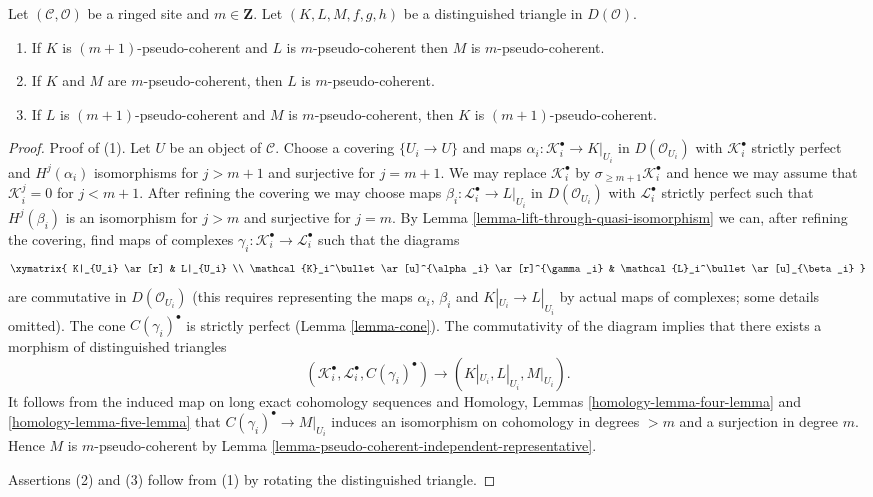 \begin{lemma}
\label{lemma-cone-pseudo-coherent}
Let $(\mathcal{C}, \mathcal{O})$ be a ringed site and $m \in \mathbf{Z}$.
Let $(K, L, M, f, g, h)$ be a distinguished triangle in $D(\mathcal{O})$.
\begin{enumerate}
\item If $K$ is $(m + 1)$-pseudo-coherent and $L$ is $m$-pseudo-coherent
then $M$ is $m$-pseudo-coherent.
\item If $K$ and $M$ are $m$-pseudo-coherent, then $L$ is $m$-pseudo-coherent.
\item If $L$ is $(m + 1)$-pseudo-coherent and $M$
is $m$-pseudo-coherent, then $K$ is $(m + 1)$-pseudo-coherent.
\end{enumerate}
\end{lemma}

\begin{proof}
Proof of (1). Let $U$ be an object of $\mathcal{C}$. Choose a covering
$\{U_i \to U\}$ and maps $\alpha_i : \mathcal{K}_i^\bullet \to K|_{U_i}$
in $D(\mathcal{O}_{U_i})$ with $\mathcal{K}_i^\bullet$ strictly perfect and
$H^j(\alpha_i)$ isomorphisms for $j > m + 1$ and surjective for $j = m + 1$.
We may replace $\mathcal{K}_i^\bullet$ by
$\sigma_{\geq m + 1}\mathcal{K}_i^\bullet$
and hence we may assume that $\mathcal{K}_i^j = 0$
for $j < m + 1$. After refining the covering we may choose
maps $\beta_i : \mathcal{L}_i^\bullet \to L|_{U_i}$ in $D(\mathcal{O}_{U_i})$
with $\mathcal{L}_i^\bullet$ strictly perfect such that
$H^j(\beta_i)$ is an isomorphism for $j > m$ and
surjective for $j = m$. By
Lemma \ref{lemma-lift-through-quasi-isomorphism}
we can, after refining the covering, find maps of complexes
$\gamma_i : \mathcal{K}_i^\bullet \to \mathcal{L}_i^\bullet$
such that the diagrams
$$
\xymatrix{
K|_{U_i} \ar[r] & L|_{U_i} \\
\mathcal{K}_i^\bullet \ar[u]^{\alpha_i} \ar[r]^{\gamma_i} &
\mathcal{L}_i^\bullet \ar[u]_{\beta_i}
}
$$
are commutative in $D(\mathcal{O}_{U_i})$ (this requires representing the
maps $\alpha_i$, $\beta_i$ and $K|_{U_i} \to L|_{U_i}$
by actual maps of complexes; some details omitted).
The cone $C(\gamma_i)^\bullet$ is strictly perfect (Lemma \ref{lemma-cone}).
The commutativity of the diagram implies that there exists a morphism
of distinguished triangles
$$
(\mathcal{K}_i^\bullet, \mathcal{L}_i^\bullet, C(\gamma_i)^\bullet)
\longrightarrow
(K|_{U_i}, L|_{U_i}, M|_{U_i}).
$$
It follows from the induced map on long exact cohomology sequences and
Homology, Lemmas \ref{homology-lemma-four-lemma} and
\ref{homology-lemma-five-lemma}
that $C(\gamma_i)^\bullet \to M|_{U_i}$ induces an isomorphism
on cohomology in degrees $> m$ and a surjection in degree $m$.
Hence $M$ is $m$-pseudo-coherent by
Lemma \ref{lemma-pseudo-coherent-independent-representative}.

\medskip\noindent
Assertions (2) and (3) follow from (1) by rotating the distinguished
triangle.
\end{proof}

